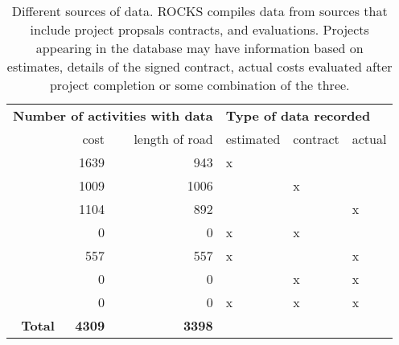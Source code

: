 \begin{table}[ht]
\centering
\caption{Different sources of data. ROCKS compiles data from sources that include project propsals contracts, and evaluations. Projects appearing in the database may have information based on estimates, details of the signed contract, actual costs evaluated after project completion or some combination of the three. \vspace{1em}} 
\label{tab_count_sources}
\begin{tabular}{rrr|lll}
   \hline
\multicolumn{3}{p{6cm}|}{\textbf{Number of activities with data}}  & \multicolumn{3}{p{5cm}}{\textbf{Type of data recorded}}  \\ 
   & cost & length of road & estimated & contract & actual \\ 
   & 1639 & 943 & x &  &  \\ 
   & 1009 & 1006 &  & x &  \\ 
   & 1104 & 892 &  &  & x \\ 
   & 0 & 0 & x & x &  \\ 
   & 557 & 557 & x &  & x \\ 
   & 0 & 0 &  & x & x \\ 
   & 0 & 0 & x & x & x \\ 
   \hline
\textbf{Total} & \textbf{4309} & \textbf{3398} &  &  &  \\ 
   \hline
\end{tabular}
\end{table}

